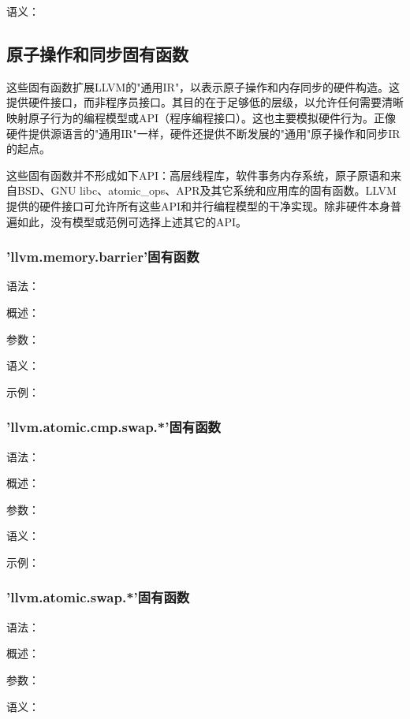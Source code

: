 \documentclass[12pt,a4paper]{article}
\begin{document}
{语义：


\subsection{原子操作和同步固有函数}

这些固有函数扩展LLVM的"通用IR"，以表示原子操作和内存同步的硬件构造。这提供硬件接口，而非程序员接口。其目的在于足够低的层级，以允许任何需要清晰映射原子行为的编程模型或API（程序编程接口）。这也主要模拟硬件行为。正像硬件提供源语言的"通用IR"一样，硬件还提供不断发展的"通用"原子操作和同步IR的起点。

这些固有函数并不形成如下API：高层线程库，软件事务内存系统，原子原语和来自BSD、GNU libc、atomic\_ops、APR及其它系统和应用库的固有函数。LLVM提供的硬件接口可允许所有这些API和并行编程模型的干净实现。除非硬件本身普遍如此，没有模型或范例可选择上述其它的API。


\subsubsection{'llvm.memory.barrier'固有函数} %

语法：

概述：

参数：

语义：

示例：


\subsubsection{'llvm.atomic.cmp.swap.*'固有函数} %

语法：

概述：

参数：

语义：

示例：


\subsubsection{'llvm.atomic.swap.*'固有函数} %

语法：

概述：

参数：

语义：

}
\end{document}
